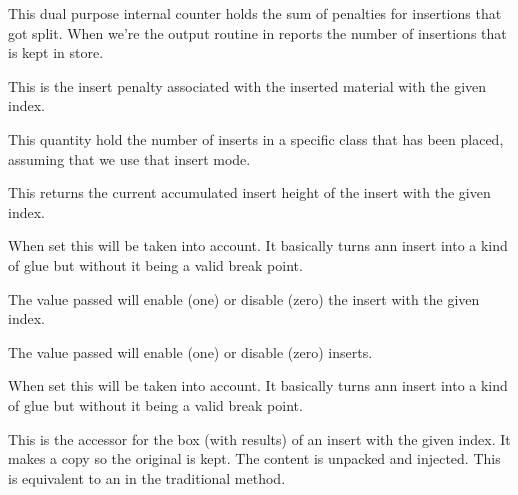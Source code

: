 This dual purpose internal counter holds the sum of penalties for insertions that
got split. When we're the output routine in reports the number of insertions that
is kept in store.

\stopoldprimitive

\startnewprimitive[title={\prm {insertpenalty}}]

This is the insert penalty associated with the inserted material with the given
index.

\stopnewprimitive

\startnewprimitive[title={\prm {insertplaced}}]

This quantity hold the number of inserts in a specific class that has been
placed, assuming that we use that insert mode.

\stopnewprimitive

\startnewprimitive[title={\prm {insertprogress}}]

This returns the current accumulated insert height of the insert with the given
index.

\stopnewprimitive

\startnewprimitive[title={\prm {insertshrink}}]

When set this will be taken into account. It basically turns ann insert into a
kind of glue but without it being a valid break point.

\stopnewprimitive

\startnewprimitive[title={\prm {insertstorage}}]

The value passed will enable (one) or disable (zero) the insert with the given
index.

\stopnewprimitive

\startnewprimitive[title={\prm {insertstoring}}]

The value passed will enable (one) or disable (zero) inserts.

\stopnewprimitive

\startnewprimitive[title={\prm {insertstretch}}]

When set this will be taken into account. It basically turns ann insert into a
kind of glue but without it being a valid break point.

\stopnewprimitive

\startnewprimitive[title={\prm {insertunbox}}]

This is the accessor for the box (with results) of an insert with the given
index. It makes a copy so the original is kept. The content is unpacked and
injected. This is equivalent to an  in the traditional method.

